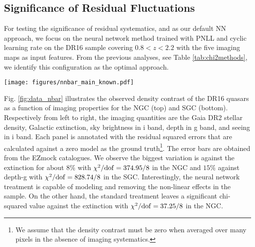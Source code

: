 \subsection{Significance of Residual Fluctuations}\label{subsec:sigreserror}
For testing the significance of residual systematics, and as our default NN approach, we focus on the neural network method trained with PNLL and cyclic learning rate on the DR16 sample covering $0.8<z<2.2$ with the five imaging maps as input features. From the previous analyses, see Table \ref{tab:chi2methods}, we identify this configuration as the optimal approach. 

\begin{figure*}
  \centering
  \texttt{[image: figures/nnbar\_main\_known.pdf]}
  \caption[Density of eBOSS quasars as a function of imaging properties.]{Density contrast of the main sample as a function of the primary imaging properties in the NGC (top) and SGC (bottom) before and after accounting for systematic effects using the standard method or neural network. The error-bars are estimated from the null EZmocks and used to calculate the $\chi^{2}$ of the mean density residuals against each imaging property.}
  \label{fig:data_nbar}
\end{figure*}

Fig. \ref{fig:data_nbar} illustrates the observed density contrast of the DR16 quasars as a function of imaging properties for the NGC (top) and SGC (bottom). Respectively from left to right, the imaging quantities are the Gaia DR2 stellar density, Galactic extinction, sky brightness in i band, depth in g band, and seeing in i band. Each panel is annotated with the residual squared errors that are calculated against a zero model as the ground truth\footnote{We assume that the density contrast must be zero when averaged over many pixels in the absence of imaging systematics.}. The error bars are obtained from the EZmock catalogues. We observe the biggest variation is against the extinction for about $8\%$ with $\chi^{2}/{\rm dof}=374.95/8$ in the NGC and $15\%$ against depth-g with $\chi^{2}/{\rm dof}=828.74/8$ in the SGC. Interestingly, the neural network treatment is capable of modeling and removing the non-linear effects in the sample. On the other hand, the standard treatment leaves a significant chi-squared value against the extinction with $\chi^{2}/{\rm dof}=37.25/8$ in the NGC.

